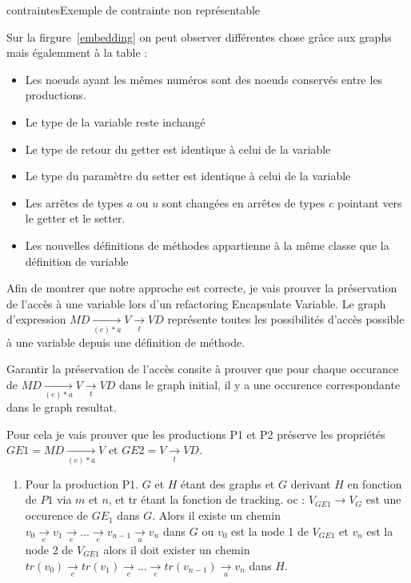 \documentclass[a4paper, 12pt]{article}
\begin{document}
\begin{figu}{contraintes}{Exemple de contrainte non représentable}
{  Sur la firgure~\ref{embedding} on peut observer différentes chose grâce aux graphs mais égalemment à la table :

  \begin{itemize}[label=\textbullet]
    \item Les noeuds ayant les mêmes numéros sont des noeuds conservés entre les productions.
    \item Le type de la variable reste inchangé
    \item Le type de retour du getter est identique à celui de la variable
    \item Le type du paramètre du setter est identique à celui de la variable
    \item Les arrêtes de types \(a\) ou \(u\) sont changées en arrêtes de types \(c\) pointant vers le getter et le setter.
    \item Les nouvelles définitions de méthodes appartienne à la même classe que la définition de variable
  \end{itemize}

  Afin de montrer que notre approche est correcte, je vais prouver la préservation de l'accès à une variable lors d'un refactoring Encapsulate Variable.
  Le graph d'expression  \(MD \underset{( e ) * a}{\rightarrow} V \underset{t}{\rightarrow}  VD\) représente toutes les possibilités d'accès possible à une variable depuis une définition de méthode.

  Garantir la préservation de l'accès consite à prouver que pour chaque occurance de \(MD \underset{( e ) * a}{\rightarrow} V \underset{t}{\rightarrow} VD\) dans le graph initial, il y a une occurence correspondante dans le graph resultat.

  Pour cela je vais prouver que les productions P1 et P2 préserve les propriétés \(GE1 = MD \underset{( e ) * a}{\rightarrow} V \) et  \(GE2 = V \underset{t}{\rightarrow}  VD\).

  \begin{enumerate}
    \item

    \begin{itemize}[label=\textbullet]

      Pour la production P1. $G$ et $H$ étant des graphs et $G$ derivant $H$ en fonction de $P1$ via $m$ et $n$, et tr étant la fonction de tracking. oc :  \( {V_{GE1}} {\rightarrow} {V_G} \) est une occurence de  {$GE_1$} dans $G$.
      Alors il existe un chemin \( v_0 \underset{e}{\rightarrow} v_1 \underset{e}{\rightarrow} ... \underset{e}{\rightarrow} v_{n-1} \underset{a}{\rightarrow} v_n \) dans $G$
      ou {$v_0$} est la node 1 de {$V_{GE1}$} et {$v_n$} est la node 2 de $V_{GE1}$
      alors il doit exister un chemin \( tr(v_0) \underset{e}{\rightarrow} tr(v_1) \underset{e}{\rightarrow} ... \underset{e}{\rightarrow} tr(v_{n-1}) \underset{a}{\rightarrow} {v_n} \) dans $H$.


\end{itemize}
\end{enumerate}}
\end{figu}
\end{document}
